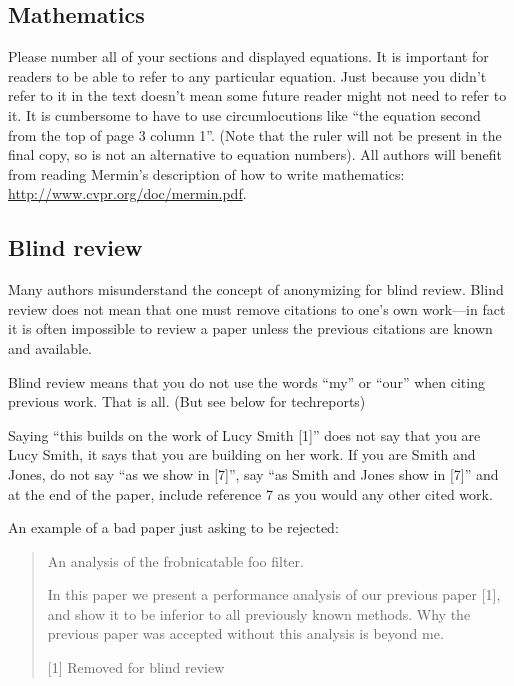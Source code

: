 \documentclass[10pt,twocolumn,letterpaper]{article}
\begin{document}
\subsection{Mathematics}

Please number all of your sections and displayed equations.  It is
important for readers to be able to refer to any particular equation.
Just because you didn't refer to it in the text doesn't mean some
future reader might not need to refer to it.  It is cumbersome to have
to use circumlocutions like ``the equation second from the top of page
3 column 1''.  (Note that the ruler will not be present in the final
copy, so is not an alternative to equation numbers).  All authors will
benefit from reading Mermin's description of how to write mathematics:
\url{http://www.cvpr.org/doc/mermin.pdf}.


\subsection{Blind review}

Many authors misunderstand the concept of anonymizing for blind
review.  Blind review does not mean that one must remove citations to
one's own work---in fact it is often impossible to review a paper
unless the previous citations are known and available.

Blind review means that you do not use the words ``my'' or ``our''
when citing previous work.  That is all.  (But see below for
techreports)

Saying ``this builds on the work of Lucy Smith [1]'' does not say that
you are Lucy Smith, it says that you are building on her work.  If you
are Smith and Jones, do not say ``as we show in [7]'', say ``as Smith
and Jones show in [7]'' and at the end of the paper, include reference
7 as you would any other cited work.

An example of a bad paper just asking to be rejected:
\begin{quote}
  \begin{center}
    An analysis of the frobnicatable foo filter.
  \end{center}

  In this paper we present a performance analysis of our previous
  paper [1], and show it to be inferior to all previously known
  methods.  Why the previous paper was accepted without this analysis
  is beyond me.

  [1] Removed for blind review
\end{quote}
\end{document}

